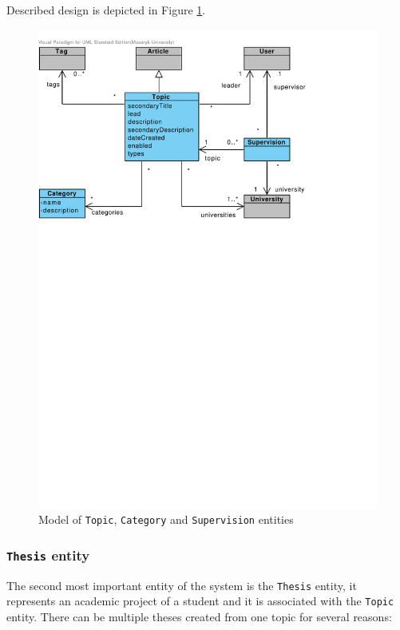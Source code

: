 Described design is depicted in Figure \ref{fig:domain-topic-category-supervision-entities}.

\begin{figure}[h]
    \centering
        \includegraphics[trim=0 510 120 30, clip, keepaspectratio, width=\textwidth]{./images/domain-topic-category-supervision-entities.pdf}
    \caption{Model of \texttt{Topic}, \texttt{Category} and \texttt{Supervision} entities}
    \label{fig:domain-topic-category-supervision-entities}
\end{figure}

\subsubsection{\textbf{\texttt{Thesis} entity}}

The second most important entity of the system is the \texttt{Thesis} entity, it represents an academic project of a student and it is associated with the \texttt{Topic} entity. There can be multiple theses created from one topic for several reasons:

